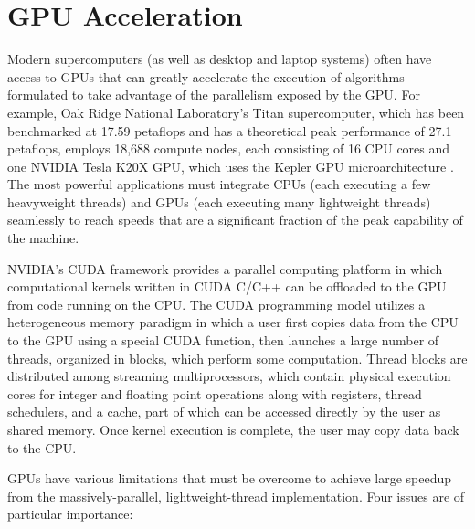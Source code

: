 \documentclass[]{elsart}
\begin{document}
\section{\label{GPUacceleration} GPU Acceleration}

Modern supercomputers (as well as desktop and laptop systems) often have access 
to GPUs that can greatly accelerate the execution of algorithms formulated to 
take advantage of the parallelism exposed by the GPU. For example, Oak Ridge 
National Laboratory's Titan supercomputer, which has been benchmarked at 17.59 
petaflops and has a theoretical peak performance of 27.1 petaflops, employs 
18,688 compute nodes, each consisting of 16 CPU cores and one NVIDIA Tesla K20X 
GPU, which uses the Kepler GPU microarchitecture \cite{top500}.  The most 
powerful applications must integrate CPUs (each executing a few heavyweight 
threads) and GPUs (each executing many lightweight threads) seamlessly to reach 
speeds that are a significant fraction of the peak capability of the machine.

NVIDIA's CUDA framework provides a parallel computing platform in which 
computational kernels written in CUDA C/C++ can be offloaded to the GPU from 
code running on the CPU. The CUDA programming model utilizes a heterogeneous 
memory paradigm in which a user first copies data from the CPU to the GPU using 
a special CUDA function, then launches a large number of threads, organized in 
blocks, which perform some computation.  Thread blocks are distributed among 
streaming multiprocessors, which contain physical execution cores for integer 
and floating point operations along with registers, thread schedulers, and a 
cache, part of which can be accessed directly by the user as shared memory.  
Once kernel execution is complete, the user may copy data back to the CPU.

GPUs have various limitations that must be overcome 
to achieve large speedup from the massively-parallel, lightweight-thread 
implementation. Four issues are of particular importance:
\end{document}
